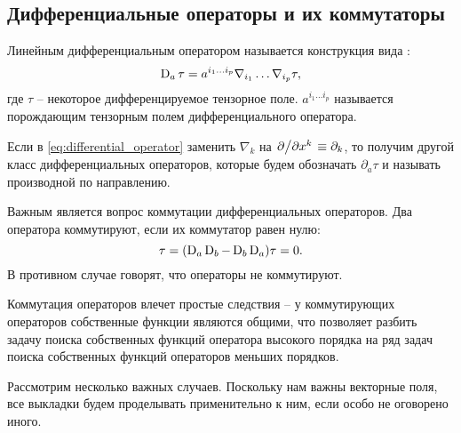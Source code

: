 \documentclass[12pt,a4paper]{article}
\begin{document}

    \subsection{Дифференциальные операторы и их коммутаторы\label{sec:commutators}}

        Линейным дифференциальным оператором называется конструкция вида \cite{differential_operator_commutators}:
        \begin{equation}\label{eq:differential_operator}
            \operatorname{D}_a\tau = a^{i_1 \dots i_p} \nabla_{i_1} \dots \nabla_{i_p} \tau ,
        \end{equation}
        где $\tau$ -- некоторое дифференцируемое тензорное поле. $a^{i_1 \dots i_p}$ называется порождающим тензорным полем дифференциального оператора.

        Если в \autoref{eq:differential_operator} заменить $\nabla_k$ на $\pdv*{x^k} \equiv \partial_k$, то получим другой класс дифференциальных операторов, которые будем обозначать $\partial_a\tau$ и называть производной по направлению.

        Важным является вопрос коммутации дифференциальных операторов. Два оператора коммутируют, если их коммутатор равен нулю:
        \begin{equation}
            [\D_a, \D_b]\tau = (\D_a \D_b - \D_b \D_a) \tau = 0 .
        \end{equation}
        В противном случае говорят, что операторы не коммутируют.

        Коммутация операторов влечет простые следствия -- у коммутирующих операторов собственные функции являются общими, что позволяет разбить задачу поиска собственных функций оператора высокого порядка на ряд задач поиска собственных функций операторов меньших порядков.

        Рассмотрим несколько важных случаев. Поскольку нам важны векторные поля, все выкладки будем проделывать применительно к ним, если особо не оговорено иного.

\end{document}
